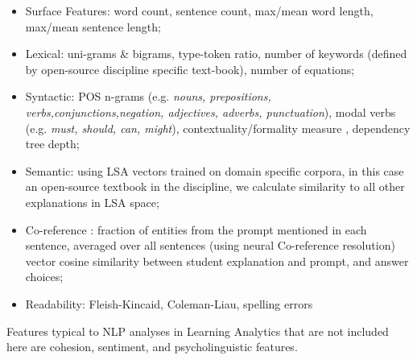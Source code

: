 \documentclass[notitlepage,12pt]{jedm}
\begin{document}
\begin{itemize}
	
	\item Surface Features: 
	word count,
	sentence count, 
	max/mean word length, 
	max/mean sentence length;
	
	\item Lexical: 
	uni-grams \& bigrams, 
	type-token ratio, 
	number of keywords (defined by open-source discipline specific 
	text-book), 
	number of equations;
	
	\item Syntactic: 
	POS n-grams (e.g. \textit{nouns, prepositions, 
		verbs,conjunctions,negation, adjectives, adverbs, punctuation}), 
	modal verbs (e.g. \textit{must, should, can, might}),
	contextuality/formality measure \cite{heylighen_variation_2002},
	dependency tree depth;
	
	\item Semantic:
	using LSA vectors trained on domain specific corpora, in this case an 
	open-source textbook in the discipline, we calculate similarity to all 
	other explanations in LSA space;
	
	\item Co-reference \cite{persing_end--end_2016}: 
	fraction of entities from the prompt mentioned in each sentence, 
	averaged over all sentences (using neural Co-reference resolution)
	vector cosine similarity between student explanation and prompt, 
	and answer choices; 
	
	\item Readability:
	Fleish-Kincaid,
	Coleman-Liau,
	spelling errors
\end{itemize}


Features typical to NLP analyses in Learning Analytics that are not included 
here are cohesion, sentiment, and psycholinguistic features.





\end{document}

